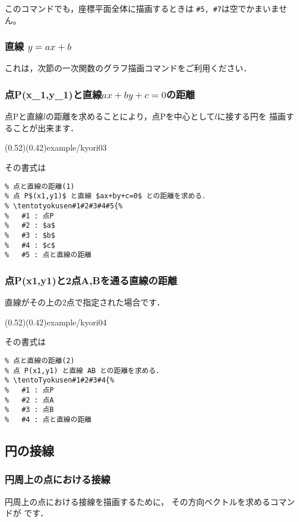 このコマンドでも，座標平面全体に描画するときは
\verb/#5, #7/は空でかまいません。

\subsubsection{直線 \texorpdfstring{\protect $y=ax+b$}{y=ax+b}}
これは，次節の一次関数のグラフ描画コマンドをご利用ください．

\subsubsection{\texorpdfstring{%
  点P\protect\retu(x_1,y_1)と直線$ax+by+c=0$の距離}{%
  点P(x1,y1)と直線ax+by+c=0}}
点Pと直線$l$の距離を求めることにより，点Pを中心として$l$に接する円を
描画することが出来ます．

    (0.52)(0.42){example/kyori03}\bigskip

その書式は

\begin{boxnote}
\begin{verbatim}
% 点と直線の距離(1)
% 点 P$(x1,y1)$ と直線 $ax+by+c=0$ との距離を求める．
% \tentotyokusen#1#2#3#4#5{%
%   #1 : 点P
%   #2 : $a$
%   #3 : $b$
%   #4 : $c$
%   #5 : 点と直線の距離
\end{verbatim}
\end{boxnote}\bigskip

\subsubsection{点P(x1,y1)と2点A,Bを通る直線の距離}
直線がその上の2点で指定された場合です．

    (0.52)(0.42){example/kyori04}\bigskip

その書式は

\begin{boxnote}
\begin{verbatim}
% 点と直線の距離(2)
% 点 P(x1,y1) と直線 AB との距離を求める．
% \tentoTyokusen#1#2#3#4{%
%   #1 : 点P
%   #2 : 点A
%   #3 : 点B
%   #4 : 点と直線の距離
\end{verbatim}
\end{boxnote}\bigskip

\subsection{円の接線}
\subsubsection{円周上の点における接線}
円周上の点における接線を描画するために，
その方向ベクトルを求めるコマンドが  です．

